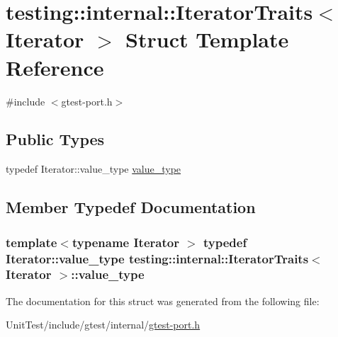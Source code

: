 \hypertarget{structtesting_1_1internal_1_1_iterator_traits}{\section{testing\+:\+:internal\+:\+:Iterator\+Traits$<$ Iterator $>$ Struct Template Reference}
\label{structtesting_1_1internal_1_1_iterator_traits}
}


{\ttfamily \#include $<$gtest-\/port.\+h$>$}

\subsection*{Public Types}
\begin{DoxyCompactItemize}
\item 
typedef Iterator\+::value\+\_\+type \hyperlink{structtesting_1_1internal_1_1_iterator_traits_a29de4320a9c53ce438d3561b94e515bb}{value\+\_\+type}
\end{DoxyCompactItemize}


\subsection{Member Typedef Documentation}
\hypertarget{structtesting_1_1internal_1_1_iterator_traits_a29de4320a9c53ce438d3561b94e515bb}{
\subsubsection[{value\+\_\+type}]{\setlength{\rightskip}{0pt plus 5cm}template$<$typename Iterator $>$ typedef Iterator\+::value\+\_\+type {\bf testing\+::internal\+::\+Iterator\+Traits}$<$ Iterator $>$\+::{\bf value\+\_\+type}}}\label{structtesting_1_1internal_1_1_iterator_traits_a29de4320a9c53ce438d3561b94e515bb}


The documentation for this struct was generated from the following file\+:\begin{DoxyCompactItemize}
\item 
Unit\+Test/include/gtest/internal/\hyperlink{gtest-port_8h}{gtest-\/port.\+h}\end{DoxyCompactItemize}
